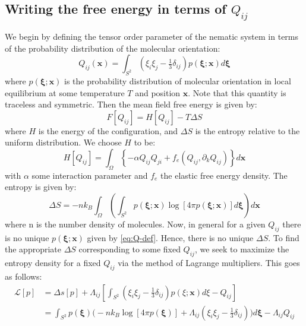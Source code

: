 \documentclass[reqno]{article}
\begin{document}
	\subsection{Writing the free energy in terms of $Q_{ij}$}
	We begin by defining the tensor order parameter of the nematic system in terms of the probability distribution of the molecular orientation:
	\begin{equation} \label{eq:Q-def}
		Q_{ij} (\mathbf{x}) 
		= \int_{S^2} \left( \xi_i \xi_j - \tfrac13 \delta_{ij} \right)
		p(\mathbf{\xi} ; \mathbf{x}) d \mathbf{\xi}
	\end{equation}
	where $p(\mathbf{\xi} ; \mathbf{x})$ is the probability distribution of molecular orientation in local equilibrium at some temperature $T$ and position $\mathbf{x}$. 
	Note that this quantity is traceless and symmetric.
	Then the mean field free energy is given by:
	\begin{equation}
		F \left[ Q_{ij} \right] = H \left[ Q_{ij} \right] - T \Delta S
	\end{equation}
	where $H$ is the energy of the configuration, and $\Delta S$ is the entropy relative to the uniform distribution.
	We choose $H$ to be:
	\begin{equation}
		H\left[ Q_{ij} \right]
		= \int_{\Omega} \left\{ -\alpha Q_{ij} Q_{ji} + f_e 	\left( Q_{ij}, \partial_k Q_{ij} \right) \right\} d \mathbf{x}
	\end{equation}
	with $\alpha$ some interaction parameter and $f_e$ the elastic free energy density.
	The entropy is given by:
	\begin{equation} \label{eq:entropy-def}
		\Delta S 
		= -n k_B \int_{\Omega} \left(
		\int_{S^2} p(\mathbf{\xi} ; \mathbf{x}) 
		\log \left[ 4 \pi p( \mathbf{\xi} ; \mathbf{x} ) \right] d \mathbf{\xi} \right) d \mathbf{x}
	\end{equation}
	where n is the number density of molecules.
	Now, in general for a given $Q_{ij}$ there is no unique $p(\mathbf{\xi} ; \mathbf{x})$ given by \eqref{eq:Q-def}. 
	Hence, there is no unique $\Delta S$.
	To find the appropriate $\Delta S$ corresponding to some fixed $Q_{ij}$, we seek to maximize the entropy density for a fixed $Q_{ij}$ via the method of Lagrange multipliers. 
	This goes as follows:
	\begin{equation}
	\begin{split}
		\mathcal{L} [p]
		&= \Delta s [p] 
		+ \Lambda_{ij} \left[\int_{S^2} 
			\left(\xi_i \xi_j - \tfrac13 \delta_{ij}\right) p\left(\xi; \mathbf{x}\right) d\xi
			- Q_{ij} \right] \\
		&= \int_{S^2} p( \mathbf{\xi}) 
		\biggl(
		-n k_B\log \left[ 4\pi p(\mathbf{\xi}) \right]
		+ \Lambda_{ij} \left( \xi_i \xi_j - \tfrac13 \delta_{ij} \right)
		\biggr) d\mathbf{\xi} - \Lambda_{ij} Q_{ij}
	\end{split}
	\end{equation}
\end{document}
